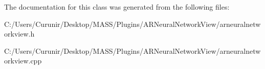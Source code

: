 The documentation for this class was generated from the following files\+:\begin{DoxyCompactItemize}
\item 
C\+:/\+Users/\+Curunir/\+Desktop/\+M\+A\+S\+S/\+Plugins/\+A\+R\+Neural\+Network\+View/arneuralnetworkview.\+h\item 
C\+:/\+Users/\+Curunir/\+Desktop/\+M\+A\+S\+S/\+Plugins/\+A\+R\+Neural\+Network\+View/arneuralnetworkview.\+cpp\end{DoxyCompactItemize}
